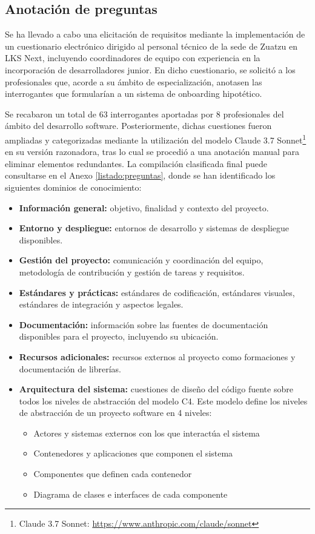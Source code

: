 \subsection{Anotación de preguntas}
Se ha llevado a cabo una elicitación de requisitos mediante la implementación de un cuestionario electrónico dirigido al personal técnico de la sede de Zuatzu en LKS Next, incluyendo coordinadores de equipo con experiencia en la incorporación de desarrolladores junior. En dicho cuestionario, se solicitó a los profesionales que, acorde a su ámbito de especialización, anotasen las interrogantes que formularían a un sistema de onboarding hipotético.

Se recabaron un total de 63 interrogantes aportadas por 8 profesionales del ámbito del desarrollo software. Posteriormente, dichas cuestiones fueron ampliadas y categorizadas mediante la utilización del modelo Claude 3.7 Sonnet\footnote{Claude 3.7 Sonnet: \url{https://www.anthropic.com/claude/sonnet}} en su versión razonadora, tras lo cual se procedió a una anotación manual para eliminar elementos redundantes. La compilación clasificada final puede consultarse en el Anexo \ref{listado:preguntas}, donde se han identificado los siguientes dominios de conocimiento:

\begin{itemize}
\item\textbf{Información general: }objetivo, finalidad y contexto del proyecto.
\item\textbf{Entorno y despliegue: }entornos de desarrollo y sistemas de despliegue disponibles.
\item\textbf{Gestión del proyecto: }comunicación y coordinación del equipo, metodología de contribución y gestión de tareas y requisitos.
\item\textbf{Estándares y prácticas: }estándares de codificación, estándares visuales, estándares de integración y aspectos legales.
\item\textbf{Documentación: }información sobre las fuentes de documentación disponibles para el proyecto, incluyendo su ubicación.
\item\textbf{Recursos adicionales: }recursos externos al proyecto como formaciones y documentación de librerías.
\item\textbf{Arquitectura del sistema: }cuestiones de diseño del código fuente sobre todos los niveles de abstracción del modelo C4\cite{brown_c4_2018}. Este modelo define los niveles de abstracción de un proyecto software en 4 niveles:
\begin{itemize}
\item Actores y sistemas externos con los que interactúa el sistema
\item Contenedores y aplicaciones que componen el sistema
\item Componentes que definen cada contenedor
\item Diagrama de clases e interfaces de cada componente
\end{itemize}
\end{itemize}


